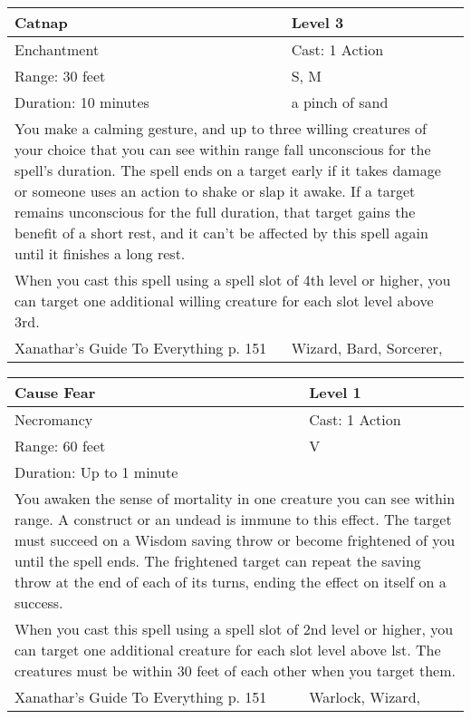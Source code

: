 \documentclass[11pt]{report}
\begin{document}
\begin{table}[H]
	\begin{tabular}{||p{6cm}|p{6cm}||}
		\hline\hline
		\bf{Catnap} & Level 3\\ \hline
		Enchantment & Cast: 1 Action\\ \hline
		Range: 30 feet & S, M\\ \hline
		Duration: 10 minutes & a pinch of sand\\ \hline
		\multicolumn{2}{||p{12cm}||}{You make a calming gesture, and up to three willing creatures of your choice that you can see within range fall unconscious for the spell’s duration. The spell ends on a target early if it takes damage or someone uses an action to shake or slap it awake. If a target remains unconscious for the full duration, that target gains the benefit of a short rest, and it can’t be affected by this spell again until it finishes a long rest.}\\ \hline
		\multicolumn{2}{||p{12cm}||}{When you cast this spell using a spell slot of 4th level or higher, you can target one additional willing creature for each slot level above 3rd.}\\ \hline
Xanathar's Guide To Everything p. 151 & Wizard, Bard, Sorcerer, \\ \hline\hline
	\end{tabular}
\end{table}

\begin{table}[H]
	\begin{tabular}{||p{6cm}|p{6cm}||}
		\hline\hline
		\bf{Cause Fear} & Level 1\\ \hline
		Necromancy & Cast: 1 Action\\ \hline
		Range: 60 feet & V\\ \hline
		Duration: Up to 1 minute & \\ \hline
		\multicolumn{2}{||p{12cm}||}{You awaken the sense of mortality in one creature you can see within range. A construct or an undead is immune to this effect. The target must succeed on a Wisdom saving throw or become frightened of you until the spell ends. The frightened target can repeat the saving throw at the end of each of its turns, ending the effect on itself on a success.}\\ \hline
		\multicolumn{2}{||p{12cm}||}{When you cast this spell using a spell slot of 2nd level or higher, you can target one additional creature for each slot level above lst. The creatures must be within 30 feet of each other when you target them.}\\ \hline
Xanathar's Guide To Everything p. 151 & Warlock, Wizard, \\ \hline\hline
	\end{tabular}
\end{table}
\end{document}

